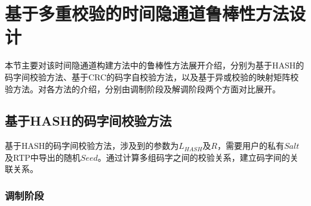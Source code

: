 \section{基于多重校验的时间隐通道鲁棒性方法设计}
\label{chap:hash:robustness}

本节主要对该时间隐通道构建方法中的鲁棒性方法展开介绍，分别为基于HASH的码字间校验方法、基于CRC的码字自校验方法，以及基于异或校验的映射矩阵校验方法。对各方法的介绍，分别由调制阶段及解调阶段两个方面对比展开。

\subsection{基于HASH的码字间校验方法}
\label{chap:hash:robustness:hash}

基于HASH的码字间校验方法，涉及到的参数为$L_{HASH}$及$R$，需要用户的私有$Salt$及RTP中导出的随机$Seed$。通过计算多组码字之间的校验关系，建立码字间的关联关系。

\subsubsection{调制阶段}
\label{chap:hash:robustness:hash:modulation}

